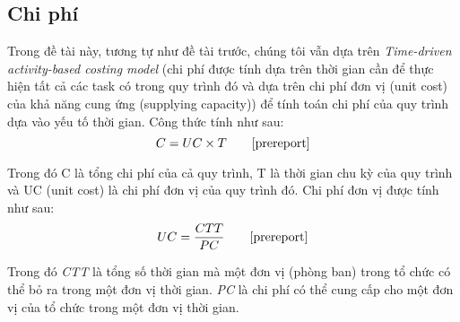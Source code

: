 \subsection{Chi phí}
Trong đề tài này, tương tự như đề tài trước, chúng tôi vẫn dựa trên \emph{Time-driven activity-based costing
model} (chi phí được tính dựa trên thời gian cần để thực hiện tất cả các task có trong quy trình đó và dựa trên chi phí đơn vị (unit cost) của khả năng cung ứng (supplying
capacity)) để tính toán chi phí của quy trình dựa vào yếu tố thời gian. Công thức tính như sau:
\[ C = UC \times T \tag*{\cite{prereport}}\]
\par
Trong đó C là tổng chi phí của cả quy trình, T là thời gian chu kỳ của quy trình và UC (unit cost) là chi phí đơn vị của quy trình đó. Chi phí đơn vị được tính như sau:
\[ UC = \frac{CTT}{PC} \tag*{\cite{prereport}}\]
\par
Trong đó \emph{CTT} là tổng số thời gian mà một đơn vị (phòng ban) trong tổ chức có thể bỏ ra trong một đơn vị thời gian. \emph{PC} là chi phí có thể cung cấp cho một đơn vị của tổ chức trong một đơn vị thời gian.